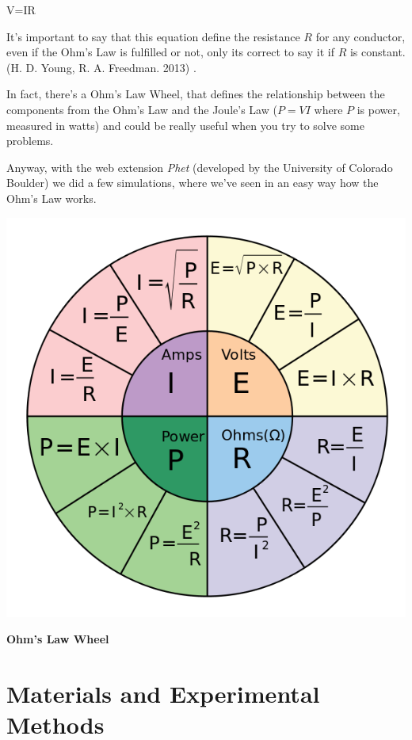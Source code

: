 \documentclass[a4paper,10pt]{article}
\begin{document}
\begin{multicols}{2}
\vspace{2mm}
\centerline{V=IR}
\vspace{2mm}
It's important to say that this equation define the resistance $R$ for any conductor, even if the Ohm's Law is fulfilled or not, only its correct to say it if $R$ is constant. (H. D. Young, R. A. Freedman. 2013) \cite{2}. \par
In fact, there's a Ohm's Law Wheel, that defines the relationship between the components from the Ohm's Law and the Joule's Law ($P=VI$ where $P$ is power, measured in watts) and could be really useful when you try to solve some problems. \par
Anyway, with the web extension \textit{Phet} (developed by the University of Colorado Boulder) we did a few simulations, where we've seen in an easy way how the Ohm's Law works.\par \vfill
\begin{center}
    \includegraphics[scale=0.3]{Images/Ohms-Law-Formula-Wheel.png} \par
    \textcolor{MiColor2}{\textbf{Ohm's Law Wheel}}
\end{center}
\section{\textcolor{MiColor1}{\textbf{Materials and Experimental Methods}}}


\end{multicols}
\end{document}
